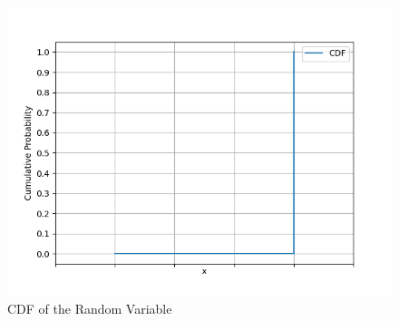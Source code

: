 \documentclass[journal]{IEEEtran}
\numberwithin{equation}{enumi}
\numberwithin{figure}{enumi}
\begin{document}
\begin{figure}
    \centering
    \includegraphics[width=0.5\linewidth]{figs/cdf.png}
    \caption{CDF of the Random Variable}
    \label{fig:enter-label}
\end{figure}
\end{document}
